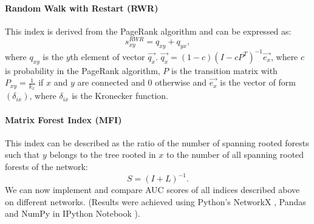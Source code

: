 \documentclass{llncs}
\begin{document}
\paragraph{Random Walk with Restart (RWR)}
%
This index is derived from the PageRank algorithm and can be expressed as:
\begin{equation}
s_{xy}^{RWR} = q_{xy} + q_{yx},
\end{equation}
where $q_{xy}$ is the $y$th element of vector $\overrightarrow{q_x}$. $\overrightarrow{q_x} = (1 - c)(I - cP^{T})^{-1} \overrightarrow{e_x}$, where $c$ is probability in the PageRank algorithm, $P$ is the transition matrix with $P_{xy} = \frac{1}{k_x}$ if $x$ and $y$ are connected and $0$ otherwise and $\overrightarrow{e_x}$ is the vector of form $(\delta_{ix})$, where $\delta_{ix}$ is the Kronecker function. 
%
\paragraph{Matrix Forest Index (MFI) \cite{mf-index}}
%
This index can be described as the ratio of the number of spanning rooted forests such that $y$ belongs to the tree rooted in $x$ to the number of all spanning rooted forests of the network:
\begin{equation}
S = (I + L)^{-1}.
\end{equation}
%
We can now implement and compare AUC scores of all indices described above on different networks. (Results were achieved using Python's NetworkX \cite{networkx}, Pandas \cite{pandas} and NumPy \cite{numpy} in IPython Notebook \cite{ipython}).
%
\setlength{\tabcolsep}{5pt}
\renewcommand{\arraystretch}{1.5}
\end{document}
